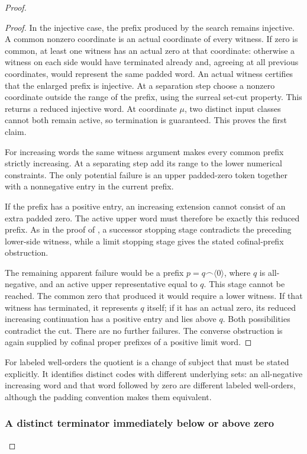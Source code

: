 \documentclass[11pt]{article}
\theoremstyle{definition}
\theoremstyle{remark}
\begin{document}
\begin{proof}
\begin{proof}
In the injective case, the prefix produced by the search remains
injective.  A common nonzero coordinate is an actual coordinate of
every witness.  If zero is common, at least one witness has an actual
zero at that coordinate: otherwise a witness on each side would
have terminated already and, agreeing at all previous coordinates,
would represent the same padded word.  An actual witness certifies
that the enlarged prefix is injective.  At a separation step choose
a nonzero coordinate outside the range of the prefix, using the
surreal set-cut property.  This returns a reduced injective word.
At coordinate \(\mu\), two distinct input classes cannot both remain
active, so termination is guaranteed.  This proves the first claim.

For increasing words the same witness argument makes every common
prefix strictly increasing.  At a separating step add its range
to the lower numerical constraints.  The only potential failure
is an upper padded-zero token together with a nonnegative entry in
the current prefix.

If the prefix has a positive entry, an increasing extension cannot
consist of an extra padded zero.  The active upper word must therefore
be exactly this reduced prefix.  As in the proof of
, a successor stopping stage contradicts
the preceding lower-side witness, while a limit stopping stage gives
the stated cofinal-prefix obstruction.

The remaining apparent failure would be a prefix
\(p=q\mathbin{\frown}\langle0\rangle\), where \(q\) is all-negative,
and an active upper representative equal to \(q\).  This stage
cannot be reached.  The common zero that produced it would require
a lower witness.  If that witness has terminated, it represents
\(q\) itself; if it has an actual zero, its reduced increasing
continuation has a positive entry and lies above \(q\).  Both
possibilities contradict the cut.  There are no further failures.
The converse obstruction is again supplied by cofinal proper
prefixes of a positive limit word.
\end{proof}

For labeled well-orders the quotient is a change of subject that
must be stated explicitly.  It identifies distinct codes with
different underlying sets: an all-negative increasing word and
that word followed by zero are different labeled well-orders,
although the padding convention makes them equivalent.

\subsubsection{A distinct terminator immediately below or above zero}


\end{proof}
\end{document}
